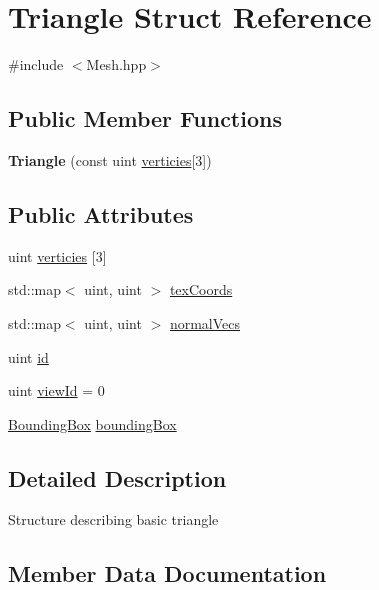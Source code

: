 \hypertarget{struct_triangle}{}\section{Triangle Struct Reference}
\label{struct_triangle}


{\ttfamily \#include $<$Mesh.\+hpp$>$}

\subsection*{Public Member Functions}
\begin{DoxyCompactItemize}
\item 
\hypertarget{struct_triangle_a88209808e641989a51c9f5e23b8857f5}{}{\bfseries Triangle} (const uint \hyperlink{struct_triangle_ae6371f947daaa0debff04c10b6fadf74}{verticies}\mbox{[}3\mbox{]})\label{struct_triangle_a88209808e641989a51c9f5e23b8857f5}

\end{DoxyCompactItemize}
\subsection*{Public Attributes}
\begin{DoxyCompactItemize}
\item 
uint \hyperlink{struct_triangle_ae6371f947daaa0debff04c10b6fadf74}{verticies} \mbox{[}3\mbox{]}
\item 
std\+::map$<$ uint, uint $>$ \hyperlink{struct_triangle_a2d3dc46484a1d1cc2802caaaa4a5f1cf}{tex\+Coords}
\item 
std\+::map$<$ uint, uint $>$ \hyperlink{struct_triangle_a9e82ef210ec3746af058c3b4793bd34d}{normal\+Vecs}
\item 
uint \hyperlink{struct_triangle_a2b02bfd83feba5fe297836b900a62c92}{id}
\item 
uint \hyperlink{struct_triangle_a18682ece909b0d90107ac391f37f5cd4}{view\+Id} = 0
\item 
\hyperlink{struct_bounding_box}{Bounding\+Box} \hyperlink{struct_triangle_a980bbf270a13c5ac9112e6e8c8c2ea89}{bounding\+Box}
\end{DoxyCompactItemize}


\subsection{Detailed Description}
Structure describing basic triangle 

\subsection{Member Data Documentation}
\hypertarget{struct_triangle_a980bbf270a13c5ac9112e6e8c8c2ea89}{}
